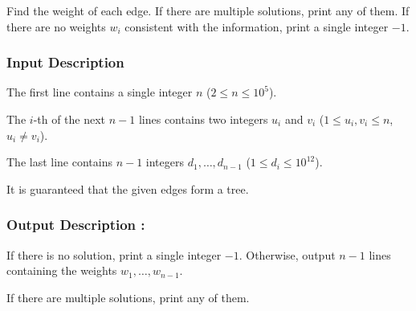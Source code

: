 \documentclass{article}
\begin{document}
Find the weight of each edge. If there are multiple solutions, print any of them. If there are no weights $w_i$ consistent with the information, print a single integer $-1$.
\paragraph{}
\subsubsection*{Input Description}The first line contains a single integer $n$ ($2 \le n \le 10^5$).

The $i$-th of the next $n-1$ lines contains two integers $u_i$ and $v_i$ ($1 \le u_i,v_i \le n$, $u_i \ne v_i$).

The last line contains $n-1$ integers $d_1,\dots,d_{n-1}$ ($1 \le d_i \le 10^{12}$).

It is guaranteed that the given edges form a tree.
\paragraph{}
\subsubsection*{Output Description : }If there is no solution, print a single integer $-1$. Otherwise, output $n-1$ lines containing the weights $w_1,\dots,w_{n-1}$.

If there are multiple solutions, print any of them.
\end{document}
